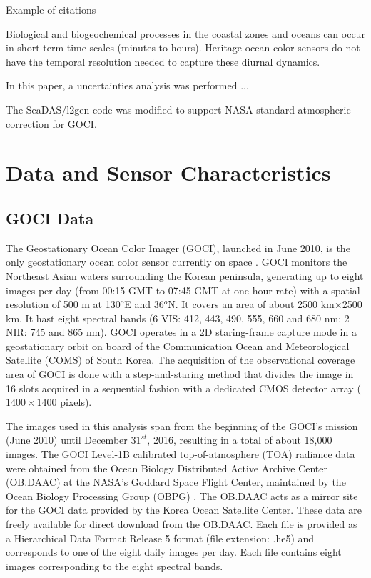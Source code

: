 \documentclass[onecolumn,3p,letterpaper,11pt]{elsarticle}
\begin{document}
Example of citations \citet{Ryu2011,He2013,Hu2016}

Biological and biogeochemical processes in the coastal zones and oceans can occur in short-term time scales (minutes to hours). Heritage ocean color sensors do not have the temporal resolution needed to capture these diurnal dynamics.

In this paper, a uncertainties analysis was performed ...

The SeaDAS/l2gen code was modified to support NASA standard atmospheric correction for GOCI.
\section{Data and Sensor Characteristics}
\subsection{GOCI Data}
The Geostationary Ocean Color Imager (GOCI), launched in June 2010, is the only geostationary ocean color sensor currently on space \citep{Ryu2012}. GOCI monitors the Northeast Asian waters surrounding the Korean peninsula, generating up to eight images per day (from 00:15 GMT to 07:45 GMT at one hour rate) with a spatial resolution of 500 m at 130$^o$E and 36$^o$N. It covers an area of about 2500 km$\times$2500 km. It hast eight spectral bands (6 VIS: 412, 443, 490, 555, 660 and 680 nm; 2 NIR: 745 and 865 nm). GOCI operates in a 2D staring-frame capture mode in a geostationary orbit on board of the Communication Ocean and Meteorological Satellite (COMS) of South Korea. The acquisition of the observational coverage area of GOCI is done with a step-and-staring method that divides the image in 16 slots acquired in a sequential fashion with a dedicated CMOS detector array ($1400\times1400$ pixels).

The images used in this analysis span from the beginning of the GOCI's mission (June 2010) until December $31^{st}$, 2016, resulting in a total of about 18,000 images. The GOCI Level-1B calibrated top-of-atmosphere (TOA) radiance data were obtained from the Ocean Biology Distributed Active Archive Center (OB.DAAC) at the NASA's Goddard Space Flight Center, maintained by the Ocean Biology Processing Group (OBPG) . The OB.DAAC acts as a mirror site for the GOCI data provided by the Korea Ocean Satellite Center. These data are freely available for direct download from the OB.DAAC. Each file is provided as a  Hierarchical Data Format Release 5 format (file extension: .he5) and corresponds to one of the eight daily images per day. Each file contains eight images corresponding to the eight spectral bands.
\end{document}
